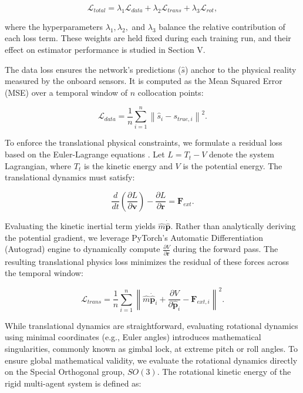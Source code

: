 \begin{equation}
    \mathcal{L}_{total} = \lambda_{1} \mathcal{L}_{data} + \lambda_{2} \mathcal{L}_{trans} + \lambda_{3} \mathcal{L}_{rot} \label{eq:loss_function},
\end{equation}

\noindent where the hyperparameters $\lambda_{1}, \lambda_{2},$ and $\lambda_{3}$ balance the relative contribution of each loss term. These weights are held fixed during each training run, and their effect on estimator performance is studied in Section V.

The data loss ensures the network's predictions ($\hat{s}$) anchor to the physical reality measured by the onboard sensors. It is computed as the Mean Squared Error (MSE) over a temporal window of $n$ collocation points:

\begin{equation}
    \mathcal{L}_{data} = \frac{1}{n} \sum_{i=1}^{n} \left\lVert \hat{s}_i - s_{true,i} \right\rVert^2 \label{eq:data_loss}.
\end{equation}

To enforce the translational physical constraints, we formulate a residual loss based on the Euler-Lagrange equations \cite{haghighatdoost_euler_2026}. Let $L = T_{t} - V$ denote the system Lagrangian, where $T_{t}$ is the kinetic energy and $V$ is the potential energy. The translational dynamics must satisfy:

\begin{equation}
    \frac{d}{dt} \left( \frac{\partial L}{\partial \mathbf{v}} \right) - \frac{\partial L}{\partial \mathbf{r}} = \mathbf{F}_{ext}.
\end{equation}

Evaluating the kinetic inertial term yields $\hat{m}\mathbf{\dot{\hat{p}}}$. Rather than analytically deriving the potential gradient, we leverage PyTorch's Automatic Differentiation (Autograd) engine to dynamically compute $\frac{\partial V}{\partial \mathbf{r}}$ during the forward pass. The resulting translational physics loss minimizes the residual of these forces across the temporal window:

\begin{equation}
    \mathcal{L}_{trans} = \frac{1}{n} \sum_{i=1}^{n} \left\lVert \hat{m} \mathbf{\dot{\hat{p}}}_i + \frac{\partial V}{\partial \mathbf{\hat{p}}_i} - \mathbf{F}_{ext, i} \right\rVert^2 \label{eq:trans_loss}.
\end{equation}

While translational dynamics are straightforward, evaluating rotational dynamics using minimal coordinates (e.g., Euler angles) introduces mathematical singularities, commonly known as gimbal lock, at extreme pitch or roll angles. To ensure global mathematical validity, we evaluate the rotational dynamics directly on the Special Orthogonal group, $SO(3)$. The rotational kinetic energy of the rigid multi-agent system is defined as:

